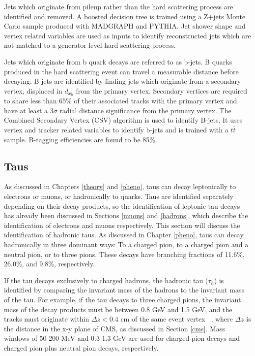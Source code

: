 \documentclass[oneside, letterpaper, oldfontcommands]{memoir}
\begin{document}
{\qquad Jets which originate from pileup rather than the hard scattering process are identified and removed. A boosted decision tree is trained using a Z+jets Monte Carlo sample produced with MADGRAPH and PYTHIA. Jet shower shape and vertex related variables are used as inputs to identify reconstructed jets which are not matched to a generator level hard scattering process. \cite{CMS-PAS-JME-13-005} 

\qqaud Jets which originate from b quark decays are referred to as b-jets. B quarks produced in the hard scattering event can travel a measurable distance before decaying. B-jets are identified by finding jets which originate from a secondary vertex, displaced in $d_{xy}$ from the primary vertex. Secondary vertices are required to share less than 65\% of their associated tracks with the primary vertex and have at least a 3$\sigma$ radial distance significance from the primary vertex. The Combined Secondary Vertex (CSV) algorithm is used to identify B-jets. It uses vertex and tracker related variables to identify b-jets and is trained with a $t\bar{t}$ sample. B-tagging efficiencies are found to be 85\%. \cite{Chatrchyan:2012jua}

\subsection{Taus}\label{taus}

\qquad As discussed in Chapters \ref{theory} and \ref{pheno}, taus can decay leptonically to electrons or muons, or hadronically to quarks. Taus are identified separately depending on their decay products, so the identification of leptonic tau decays has already been discussed in Sections \ref{muons} and \ref{hadrons}, which describe the identification of electrons and muons respectively. This section will discuss the identification of hadronic taus. As discussed in Chapter \ref{pheno}, taus can decay hadronically in three dominant ways: To a charged pion, to a charged pion and a neutral pion, or to three pions. These decays have branching fractions of 11.6\%, 26.0\%, and 9.8\%, respectively.

\qquad If the tau decays exclusively to charged hadrons, the hadronic tau ($\tau_{h}$) is identified by comparing the invariant mass of the hadrons to the invariant mass of the tau. For example, if the tau decays to three charged pions, the invariant mass of the decay products must be between 0.8 GeV and 1.5 GeV, and the tracks must originate within $\Delta z < 0.4$ cm of the same event vertex ~\cite{1748-0221-7-01-P01001}, where $\Delta z$ is the distance in the x-y plane of CMS, as discussed in Section \ref{cms}. Mass windows of 50-200 MeV and 0.3-1.3 GeV are used for charged pion decays and charged pion plus neutral pion decays, respectively. 

}
\end{document}
